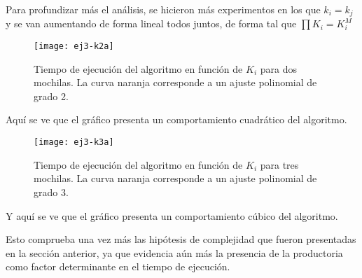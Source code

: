 \newpage

Para profundizar más el análisis, se hicieron más experimentos en los que $k_i = k_j$ y se van aumentando de forma lineal todos juntos, de forma tal que $\prod K_i = K_i^M$

\begin{figure}[H]
		\centering
		\texttt{[image: ej3-k2a]}
		\caption{Tiempo de ejecución del algoritmo en función de $K_i$ para dos mochilas. La curva naranja corresponde a un ajuste polinomial de grado 2.}
	\end{figure}	

Aquí se ve que el gráfico presenta un comportamiento cuadrático del algoritmo.

\begin{figure}[H]
		\centering
		\texttt{[image: ej3-k3a]}
		\caption{Tiempo de ejecución del algoritmo en función de $K_i$ para tres mochilas. La curva naranja corresponde a un ajuste polinomial de grado 3.}
	\end{figure}	

Y aquí se ve que el gráfico presenta un comportamiento cúbico del algoritmo.

Esto comprueba una vez más las hipótesis de complejidad que fueron presentadas en la sección anterior, ya que evidencia aún más la presencia de la productoria como factor determinante en el tiempo de ejecución.
